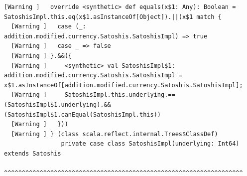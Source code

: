 \documentclass[runningheads]{llncs}
\begin{document}
\begin{lstlisting}[style=stainless]
  [Warning ]   override <synthetic> def equals(x$1: Any): Boolean = SatoshisImpl.this.eq(x$1.asInstanceOf[Object]).||(x$1 match {
  [Warning ]   case (_: addition.modified.currency.Satoshis.SatoshisImpl) => true
  [Warning ]   case _ => false
  [Warning ] }.&&({
  [Warning ]     <synthetic> val SatoshisImpl$1: addition.modified.currency.Satoshis.SatoshisImpl = x$1.asInstanceOf[addition.modified.currency.Satoshis.SatoshisImpl];
  [Warning ]     SatoshisImpl.this.underlying.==(SatoshisImpl$1.underlying).&&(SatoshisImpl$1.canEqual(SatoshisImpl.this))
  [Warning ]   }))
  [Warning ] } (class scala.reflect.internal.Trees$ClassDef)
                private case class SatoshisImpl(underlying: Int64) extends Satoshis
                ^^^^^^^^^^^^^^^^^^^^^^^^^^^^^^^^^^^^^^^^^^^^^^^^^^^^^^^^^^^^^^^^^^^
\end{lstlisting}
\end{document}
